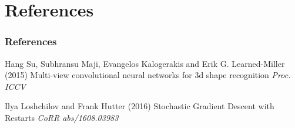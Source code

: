 \documentclass{beamer}
\begin{document}
\section{References} %

\begin{frame}
	\frametitle{References}
	\footnotesize{
		\begin{thebibliography}{99} %
			 Hang Su, Subhransu Maji, Evangelos Kalogerakis and Erik G. Learned{-}Miller (2015)
			\newblock Multi-view convolutional neural networks for 3d shape recognition
			\newblock \emph{Proc. ICCV}
		\end{thebibliography}

		\begin{thebibliography}{99} %
			 Ilya Loshchilov and Frank Hutter (2016)
			 Stochastic Gradient Descent with Restarts
			\newblock \emph{CoRR abs/1608.03983}
		\end{thebibliography}
	}
\end{frame}
\end{document}
